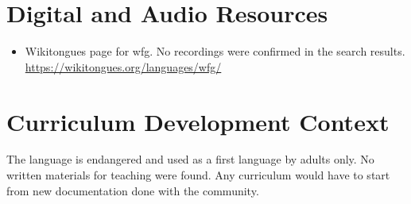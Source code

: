\documentclass[12pt]{article}
\begin{document}
\section{Digital and Audio Resources}
\begin{itemize}
\item Wikitongues page for wfg. No recordings were confirmed in the search results. \url{https://wikitongues.org/languages/wfg/}
\end{itemize}

\section{Curriculum Development Context}
The language is endangered and used as a first language by adults only. No written materials for teaching were found. Any curriculum would have to start from new documentation done with the community.
\end{document}

